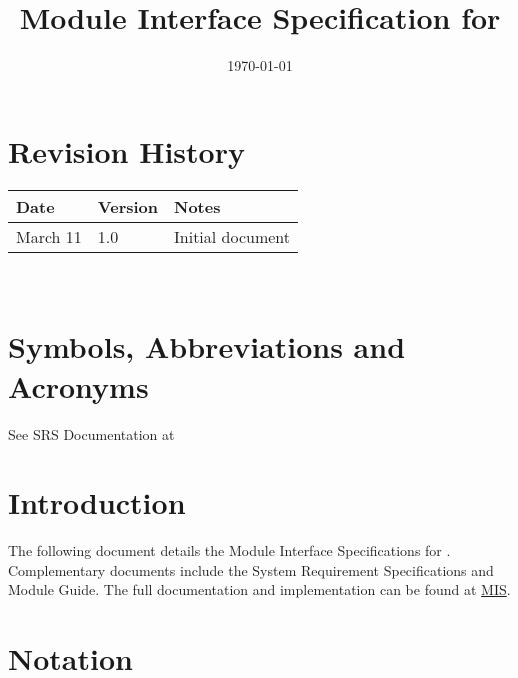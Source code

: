 \documentclass[12pt, titlepage]{article}
\begin{document}
\title{Module Interface Specification for \progname{}}

\author{\authname}

\date{\today}

\maketitle


\section{Revision History}

\begin{tabularx}{\textwidth}{p{3cm}p{2cm}X}
\toprule {\bf Date} & {\bf Version} & {\bf Notes}\\
\midrule
March 11 & 1.0 & Initial document\\
\bottomrule
\end{tabularx}

~\newpage

\section{Symbols, Abbreviations and Acronyms}

See SRS Documentation at 


\newpage

\tableofcontents

\newpage


\section{Introduction}

The following document details the Module Interface Specifications for \progname.
Complementary documents include the System Requirement Specifications
and Module Guide.  The full documentation and implementation can be
found at \href{https://github.com/marischan888/FBP-CT/tree/main/docs/Design/SoftDetailedDes}{MIS}.

\section{Notation}

\end{document}
